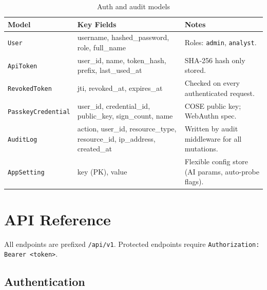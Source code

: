 \documentclass[11pt,a4paper,twoside,openright]{book}
\begin{document}
\begin{table}[H]
\centering
\begin{tabularx}{\textwidth}{L{3.5cm} L{4cm} X}
\toprule
\textbf{Model} & \textbf{Key Fields} & \textbf{Notes} \\
\midrule
\texttt{User}              & username, hashed\_password, role, full\_name & Roles: \texttt{admin}, \texttt{analyst}. \\
\texttt{ApiToken}          & user\_id, name, token\_hash, prefix, last\_used\_at & SHA-256 hash only stored. \\
\texttt{RevokedToken}      & jti, revoked\_at, expires\_at & Checked on every authenticated request. \\
\texttt{PasskeyCredential} & user\_id, credential\_id, public\_key, sign\_count, name & COSE public key; WebAuthn spec. \\
\texttt{AuditLog}          & action, user\_id, resource\_type, resource\_id, ip\_address, created\_at & Written by audit middleware for all mutations. \\
\texttt{AppSetting}        & key (PK), value & Flexible config store (AI params, auto-probe flags). \\
\bottomrule
\end{tabularx}
\caption{Auth and audit models}
\end{table}

\section{API Reference}

All endpoints are prefixed \texttt{/api/v1}. Protected endpoints require \texttt{Authorization: Bearer <token>}.

\subsection{Authentication}
\end{document}
